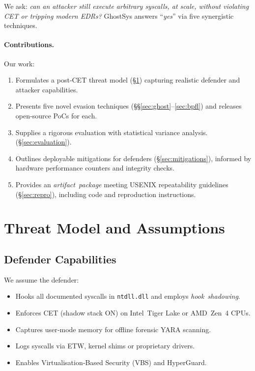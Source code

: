 \documentclass[11pt,letterpaper]{article}
\begin{document}
    We ask: \emph{can an attacker still execute arbitrary syscalls, at scale, without violating CET or tripping modern EDRs?} GhostSys answers “\emph{yes}” via five synergistic techniques.

    \paragraph{Contributions.} Our work:
    \begin{enumerate}
    \item Formulates a post‑CET threat model (§\ref{sec:threat}) capturing realistic defender and attacker capabilities.
    \item Presents five novel evasion techniques (§§\ref{sec:ghost}–\ref{sec:bpfl}) and releases open‑source PoCs for each.
    \item Supplies a rigorous evaluation with statistical variance analysis. (§\ref{sec:evaluation}).
    \item Outlines deployable mitigations for defenders (§\ref{sec:mitigations}), informed by hardware performance counters and integrity checks.
    \item Provides an \emph{artifact package} meeting USENIX repeatability guidelines (§\ref{sec:repro}), including code and reproduction instructions.
    \end{enumerate}

    \section{Threat Model and Assumptions}
    \label{sec:threat}
    \subsection{Defender Capabilities}
    We assume the defender:
    \begin{itemize}
    \item Hooks all documented syscalls in \texttt{ntdll.dll} and employs \emph{hook shadowing}.
    \item Enforces CET (shadow stack ON) on Intel Tiger Lake or AMD Zen 4 CPUs.
    \item Captures user‑mode memory for offline forensic YARA scanning.
    \item Logs syscalls via ETW, kernel shims or proprietary drivers.
    \item Enables Virtualisation‑Based Security (VBS) and HyperGuard.
    \end{itemize}
\end{document}
